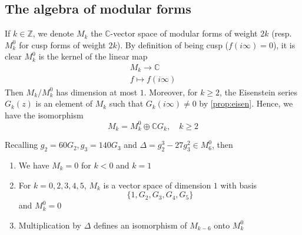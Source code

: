 \documentclass[12pt]{article}
\theoremstyle{definition}
\begin{document}
\subsection{The algebra of modular forms}
If \(k \in \mathbb{Z} \), we denote \(M_k\) the \(\mathbb{C} \)-vector space of modular forms of weight \(2k\) (resp. \(M_k^0\) for cusp forms of weight \(2k\)). By definition of being cusp (\(f(i\infty ) = 0\)), it is clear \(M_k^0\) is the kernel of the linear map 
\begin{align*}
M_k \to \mathbb{C} \\
f \mapsto f(i\infty )
\end{align*}     
Then \(M_k/M_k^0\) has dimension at most \(1\). Moreover, for \(k\geq 2\), the Eisenstein series \(G_k(z)\) is an element of \(M_k\) such that \(G_k(i\infty )\ne 0\) by \cref{prop:eisen}. Hence, we have the isomorphism
\[
    M_k = M_k^0 \oplus \mathbb{C} G_k, \quad k\geq 2
\]    
\begin{thm}[label=33]
    Recalling \(g_2 = 60G_2, g_3 = 140G_3\) and \(\Delta = g_2^3 - 27g_3^2 \in M_6^0\), then
\begin{enumerate}
    \item We have \(M_k=0\) for \(k<0\) and \(k=1\)
    \item For \(k=0,2,3,4,5\), \(M_k\) is a vector space of dimension \(1\) with basis \[\{ 1,G_2,G_3,G_4,G_5 \} \] and \(M_k^0=0\) 
    \item Multiplication by \(\Delta \) defines an isomorphism of \(M_{k-6}\) onto \(M_k^0\)  
\end{enumerate}
\end{thm}
\end{document}
